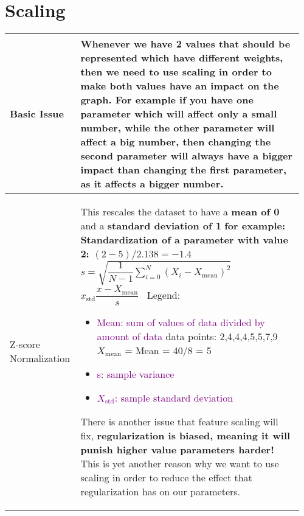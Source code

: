 \documentclass[main.tex,fontsize=8pt,paper=a4,paper=portrait,DIV=calc,]{scrartcl}
\begin{document}
\begin{table}[ht!]
\section{Scaling}
\begin{tabular}{|m{0.2\linewidth}|m{0.755\linewidth}|}
\hline
Basic Issue & 
Whenever we have 2 values that should be represented which have different \textbf{weights}, then we need to use scaling in order to make both values have an impact on the graph.\newline
For example if you have one parameter which will affect only a small number, while the other parameter will affect a big number, then changing the second parameter will always \newline
have a bigger impact than changing the first parameter, as it affects a bigger number.\\
\hline
Z-score Normalization &
\textcolor{OliveGreen}{This rescales the dataset to have a \textbf{mean of 0} and a \textbf{standard deviation of 1}}\newline
\textbf{for example: Standardization of a parameter with value 2: \((2-5)/2.138 = -1.4\)}\newline
\, \newline
\huge \( s = \sqrt{\dfrac{1}{N-1}\sum_{i=0}^{N}(X_i - X_{\text{mean}})^2} \)\newline
\, \newline
\( x_{\text{std}} \dfrac{x - X_{\text{mean}}}{s} \)\newline
\normalsize \, \newline
Legend:\newline
\begin{itemize}
\item \textcolor{purple}{Mean: sum of values of data divided by amount of data}\newline
  data points: 2,4,4,4,5,5,7,9\newline
  \(X_{\text{mean}}\) = Mean = 40/8 = 5
\item \textcolor{purple}{s: sample variance}
\item \textcolor{purple}{\(X_{\text{std}}\): sample standard deviation}
\end{itemize} 
There is another issue that feature scaling will fix, \textbf{regularization is biased, meaning it will punish higher value parameters harder!}\newline
This is yet another reason why we want to use scaling in order to reduce the effect that regularization has on our parameters.\\
\hline
\end{tabular}

\end{table}
\end{document}
